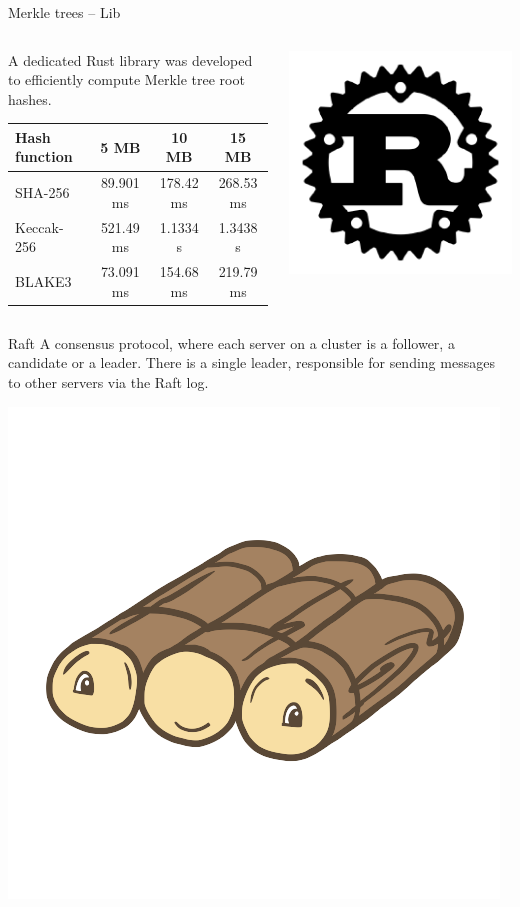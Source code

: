 \begin{frame}{Merkle trees -- Lib}
    \begin{columns}[c]
        \begin{column}{0.7\textwidth}
            A dedicated Rust library was developed to efficiently compute Merkle tree root hashes.
            \begin{table}[h!]
                \centering
                \footnotesize %
                \begin{tabular}{|l|c|c|c|}
                \hline
                    \textbf{Hash function} & \textbf{5 MB} & \textbf{10 MB} & \textbf{15 MB} \\
                \hline
                    SHA-256   & 89.901 ms  & 178.42 ms  & 268.53 ms \\
                    Keccak-256 & 521.49 ms & 1.1334 s   & 1.3438 s \\
                    BLAKE3    & 73.091 ms  & 154.68 ms  & 219.79 ms \\
                \hline
                \end{tabular}
            \end{table}
        \end{column}
        \begin{column}{0.3\textwidth}
            \centering
            \includegraphics[width=.4\linewidth]{static/rust-logo.png}
        \end{column}
    \end{columns}

\end{frame}

\begin{frame}{Raft}
A consensus protocol, where each server on a cluster is a follower, a candidate
or a leader. There is a single leader, responsible for sending messages to other servers via the Raft log.

\centering
\includegraphics[width=.4\linewidth]{static/raft-logo.png}

\end{frame}

